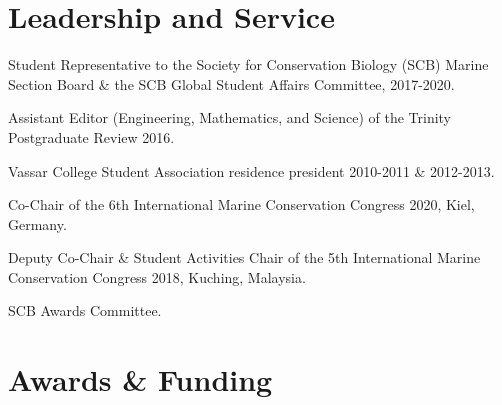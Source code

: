 \documentclass[a4paper]{deedy-resume} %
\begin{document}

\begin{flushleft}

\sectionspace


\section{Leadership and Service} 


\begin{tightitemize}
\item Student Representative to the Society for Conservation Biology (SCB) Marine Section Board \& the SCB Global Student Affairs Committee, 2017-2020. 
\item Assistant Editor (Engineering, Mathematics, and Science) of the Trinity Postgraduate Review 2016.
\item Vassar College Student Association residence president 2010-2011 \& 2012-2013.
\end{tightitemize}

\sectionspace

\begin{tightitemize}
\item Co-Chair of the 6th International Marine Conservation Congress 2020, Kiel, Germany.
\item Deputy Co-Chair \& Student Activities Chair of the 5th International Marine Conservation Congress 2018, Kuching, Malaysia.
\item SCB Awards Committee.
\end{tightitemize}

\sectionspace




\section{Awards \& Funding}
\sectionspace


\end{flushleft}
\end{document}
